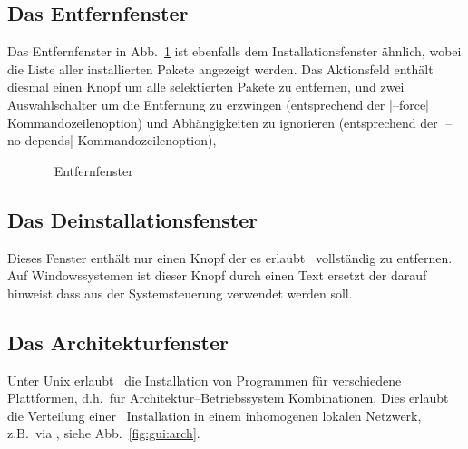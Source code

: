 \subsection{Das Entfernfenster}

Das Entfernfenster in Abb.~\ref{fig:gui:remove}
ist ebenfalls dem Installationsfenster ähnlich, wobei
die Liste aller installierten Pakete angezeigt werden. Das Aktionsfeld
enthält diesmal einen Knopf um alle selektierten Pakete zu entfernen, und
zwei Auswahlschalter um die Entfernung zu erzwingen (entsprechend
der |--force| Kommandozeilenoption) und Abhängigkeiten zu ignorieren
(entsprechend der |--no-depends| Kommandozeilenoption), 

\begin{figure}[ht!]
  \centering
  \caption{\tlmgr\  Entfernfenster}
  \label{fig:gui:remove}
\end{figure}

\subsection{Das Deinstallationsfenster}

Dieses Fenster enthält nur einen Knopf der es erlaubt \tl\ vollständig
zu entfernen. Auf Windowssystemen ist dieser Knopf durch einen Text
ersetzt der darauf hinweist dass  aus der Systemsteuerung
verwendet werden soll.

\subsection{Das Architekturfenster}

Unter Unix erlaubt \tl\ die Installation von Programmen für verschiedene
Plattformen, d.h.\ für Architektur--Betriebssystem Kombinationen. Dies
erlaubt die Verteilung einer \tl\ Installation in einem inhomogenen
lokalen Netzwerk, z.B.\ via , siehe Abb.~\ref{fig:gui:arch}.

